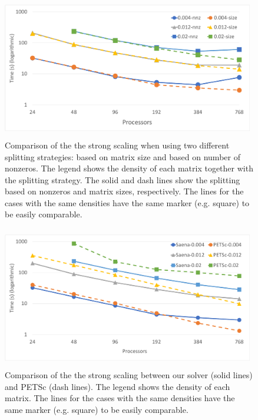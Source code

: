 \begin{figure}[p]
    \centering
    \includegraphics[width=11cm,height=6.2cm]{./figures/strong_size_vs_nnz2.pdf}
    \caption{Comparison of the the strong scaling when using two different splitting strategies: based on matrix size and based on number of nonzeros. The legend shows the density of each matrix together with the splitting strategy. The solid and dash lines show the splitting based on nonzeros and matrix sizes, respectively. The lines for the cases with the same densities have the same marker (e.g. square) to be easily comparable.}
    \label{fig:strongvs}
\end{figure}

\begin{figure}[p]
    \centering
    \includegraphics[width=11cm,height=6.2cm]{./figures/strong_size_vs_petsc2.pdf}
    \caption{Comparison of the the strong scaling between our solver (solid lines) and PETSc (dash lines). The legend shows the density of each matrix. The lines for the cases with the same densities have the same marker (e.g. square) to be easily comparable.}
    \label{fig:petsc1}
\end{figure}


